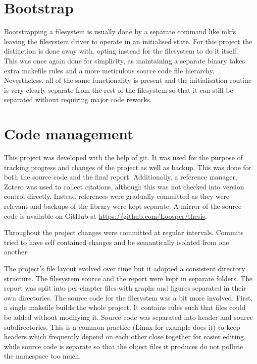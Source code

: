     \section{Bootstrap}

        Bootstrapping a filesystem is usually done by a separate command like
        mkfs \cite{man_mkfs} leaving the filesystem driver to operate in an
        initialised state. For this project the distinction is done away with,
        opting instead for the filesystem to do it itself. This was once again
        done for simplicity, as maintaining a separate binary takes extra
        makefile rules and a more meticulous source code file hierarchy.
        Nevertheless, all of the same functionality is present and the
        initialisation routine is very clearly separate from the rest of the
        filesystem so that it can still be separated without requiring major
        code reworks.

    \section{Code management}

        This project was developed with the help of git. It was used for the
        purpose of tracking progress and changes of the project as well as
        backup. This was done for both the source code and the final report.
        Additionally, a reference manager, Zotero \cite{zotero} was used to
        collect citations, although this was not checked into version control
        directly. Instead references were gradually committed as they were
        relevant and backups of the library were kept separate. A mirror of
        the source code is available on GitHub at \url{https://github.com/Loosper/thesis}.

        Throughout the project changes were committed at regular intervals.
        Commits tried to have self contained changes and be semantically
        isolated from one another.

        The project's file layout evolved over time but it adopted a
        consistent directory structure. The filesystem source and the report
        were kept in separate folders. The report was split into per-chapter
        files with graphs and figures separated in their own directories. The
        source code for the filesystem was a bit more involved. First, a single
        makefile builds the whole project. It contains rules such that files
        could be added without modifying it. Source code was separated into
        header and source subdirectories. This is a common practice (Linux
        for example does it) to keep headers which
        frequently depend on each other close together for easier editing,
        while source code is separate so that the object files it produces do
        not pollute the namespace too much.
